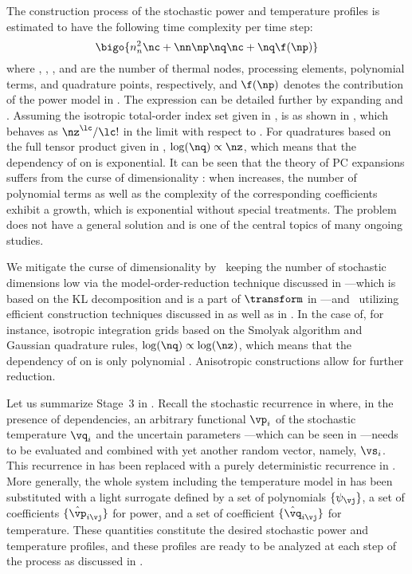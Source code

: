 The construction process of the stochastic power and temperature profiles is
estimated to have the following time complexity per time step:
\[
  \bigo{n_n^2 \nc + \nn \np \nq \nc + \nq \f(\np)}
\]
where \nn, \np, \nc, and \nq are the number of thermal nodes, processing
elements, polynomial terms, and quadrature points, respectively, and $\f(\np)$
denotes the contribution of the power model in . The
expression can be detailed further by expanding \nc and \nq. Assuming the
isotropic total-order index set given in , \nc
is as shown in , which behaves as
$\nz^\lc / \lc!$ in the limit with respect to \nz. For quadratures based on the
full tensor product given in , $\log(\nq) \propto \nz$,
which means that the dependency of \nq on \nz is exponential. It can be seen
that the theory of \ac{PC} expansions suffers from the curse of dimensionality
\cite{eldred2008, xiu2010}: when \nz increases, the number of polynomial terms
as well as the complexity of the corresponding coefficients exhibit a growth,
which is exponential without special treatments. The problem does not have a
general solution and is one of the central topics of many ongoing studies.

We mitigate the curse of dimensionality by \one~keeping the number of stochastic
dimensions low via the model-order-reduction technique discussed in
---which is based on the \ac{KL} decomposition
and is a part of $\transform$ in ---and
\two~utilizing efficient construction techniques discussed in
 as well as in . In the case
of, for instance, isotropic integration grids based on the Smolyak algorithm and
Gaussian quadrature rules, $\log(\nq) \propto \log(\nz)$, which means that the
dependency of \nq on \nz is only polynomial \cite{heiss2008}. Anisotropic
constructions allow for further reduction.

Let us summarize Stage~3 in . Recall the stochastic
recurrence in  where, in the presence of
dependencies, an arbitrary functional $\vp_i$ of the stochastic temperature
$\vq_i$ and the uncertain parameters \vu---which can be seen in
---needs to be evaluated and combined with yet another
random vector, namely, $\vs_i$. This recurrence in
 has been replaced with a purely deterministic
recurrence in . More generally, the whole system
including the temperature model in  has been
substituted with a light surrogate defined by a set of polynomials $\{
\psi_{\vj} \}$, a set of coefficients $\{ \hat{\vp}_{i \vj} \}$ for power, and a
set of coefficient $\{ \hat{\vq}_{i \vj} \}$ for temperature. These quantities
constitute the desired stochastic power and temperature profiles, and these
profiles are ready to be analyzed at each step of the process as discussed in
.

